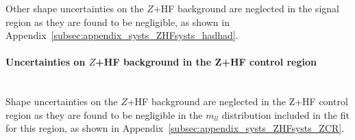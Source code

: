 Other shape uncertainties on the $Z$+HF background are neglected in the \hadhad signal region as they are found to be negligible, as shown in Appendix~\ref{subsec:appendix_systs_ZHFsysts_hadhad}.


\paragraph{Uncertainties on $Z$+HF background in the Z+HF control region}\mbox{}\\

Shape uncertainties on the $Z$+HF background are neglected in the Z+HF control region as they are found to be negligible in the $m_{ll}$ distribution included in the fit for this region, as shown in Appendix~\ref{subsec:appendix_systs_ZHFsysts_ZCR}.

